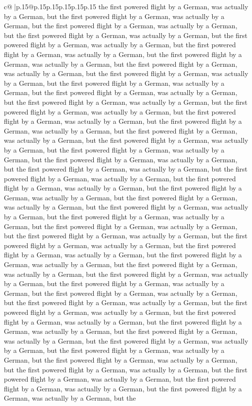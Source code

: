 \documentclass{article}
\begin{document}
{\begin{supertabular}{c@{$\;$}|p{.15\linewidth}@{}p{.15\linewidth}p{.15\linewidth}p{.15\linewidth}p{.15\linewidth}p{.15\linewidth}}
{{{the first powered flight by a German, was actually by a German, but the first powered flight by a German, was actually by a German, but the first powered flight by a German, was actually by a German, but the first powered flight by a German, was actually by a German, but the first powered flight by a German, was actually by a German, but the first powered flight by a German, was actually by a German, but the first powered flight by a German, was actually by a German, but the first powered flight by a German, was actually by a German, but the first powered flight by a German, was actually by a German, but the first powered flight by a German, was actually by a German, but the first powered flight by a German, was actually by a German, but the first powered flight by a German, was actually by a German, but the first powered flight by a German, was actually by a German, but the first powered flight by a German, was actually by a German, but the first powered flight by a German, was actually by a German, but the first powered flight by a German, was actually by a German, but the first powered flight by a German, was actually by a German, but the first powered flight by a German, was actually by a German, but the first powered flight by a German, was actually by a German, but the first powered flight by a German, was actually by a German, but the first powered flight by a German, was actually by a German, but the first powered flight by a German, was actually by a German, but the first powered flight by a German, was actually by a German, but the first powered flight by a German, was actually by a German, but the first powered flight by a German, was actually by a German, but the first powered flight by a German, was actually by a German, but the first powered flight by a German, was actually by a German, but the first powered flight by a German, was actually by a German, but the first powered flight by a German, was actually by a German, but the first powered flight by a German, was actually by a German, but the first powered flight by a German, was actually by a German, but the first powered flight by a German, was actually by a German, but the first powered flight by a German, was actually by a German, but the first powered flight by a German, was actually by a German, but the first powered flight by a German, was actually by a German, but the first powered flight by a German, was actually by a German, but the first powered flight by a German, was actually by a German, but the first powered flight by a German, was actually by a German, but the first powered flight by a German, was actually by a German, but the first powered flight by a German, was actually by a German, but the first powered flight by a German, was actually by a German, but the first powered flight by a German, was actually by a German, but the first powered flight by a German, was actually by a German, but the first powered flight by a German, was actually by a German, but the first powered flight by a German, was actually by a German, but the first powered flight by a German, was actually by a German, but the first powered flight by a German, was actually by a German, but the }}}
\end{supertabular}}
\end{document}
